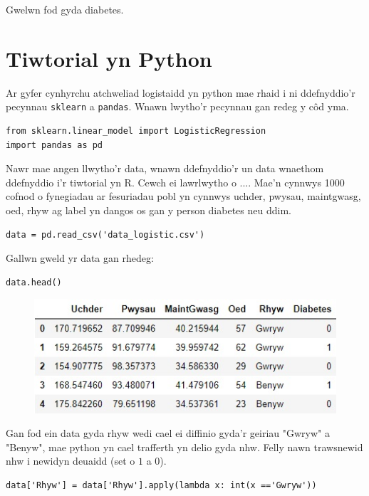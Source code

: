 Gwelwn fod gyda diabetes.

\section{Tiwtorial yn Python}

Ar gyfer cynhyrchu atchweliad logistaidd yn python mae rhaid i ni ddefnyddio'r pecynnau \texttt{sklearn} a \texttt{pandas}. Wnawn lwytho'r pecynnau gan redeg y c\^{o}d yma.

\begin{verbatim}
from sklearn.linear_model import LogisticRegression
import pandas as pd
\end{verbatim}

Nawr mae angen llwytho'r data, wnawn ddefnyddio'r un data wnaethom ddefnyddio i'r tiwtorial yn R. Cewch ei lawrlwytho o .... Mae'n cynnwys 1000 cofnod o fynegiadau ar fesuriadau pobl yn cynnwys uchder, pwysau, maintgwasg, oed, rhyw ag label yn dangos os gan y person diabetes neu ddim.  

\begin{verbatim}
data = pd.read_csv('data_logistic.csv')
\end{verbatim}

Gallwn gweld yr data gan rhedeg:

\begin{verbatim}
data.head()
\end{verbatim}

\begin{figure}[H]
\begin{center}
\includegraphics[width=0.5\linewidth]{../img/data_diabetes_python.jpg}
\end{center}
\end{figure}

Gan fod ein data gyda rhyw wedi cael ei diffinio gyda'r geiriau "Gwryw" a "Benyw", mae python yn cael trafferth yn delio gyda nhw. Felly nawn trawsnewid nhw i newidyn deuaidd (set o $1$ a $0$).

\begin{verbatim}
data['Rhyw'] = data['Rhyw'].apply(lambda x: int(x =='Gwryw'))
\end{verbatim}


